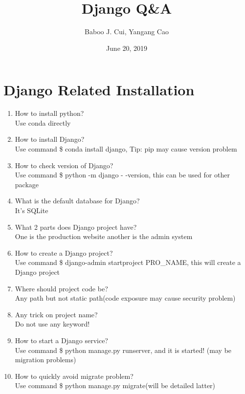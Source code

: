 \documentclass[10pt,a4paper,oneside]{article}
\date{June 20, 2019}
\author{Baboo J. Cui, Yangang Cao}
\title{Django Q\&A}
\begin{document}
\maketitle
\tableofcontents

\newpage

\section{Django Related Installation}
\begin{enumerate}[1.]
\item How to install python?\\
Use conda directly
\item How to install Django?\\
Use command \$ conda install django, Tip: pip may cause version problem
\item How to check version of Django?\\
Use command \$ python -m django - -version, this can be used for other package
\item What is the default database for Django?\\
It’s SQLite
\item What 2 parts does Django project have?\\
One is the production website another is the admin system
\item How to create a Django project?\\
Use command \$ django-admin startproject PRO\_NAME, this will create a Django project
\item Where should project code be?\\
Any path but not static path(code exposure may cause security problem)
\item Any trick on project name?\\
Do not use any keyword!
\item How to start a Django service?\\
Use command \$ python manage.py runserver, and it is started! (may be migration problems)
\item How to quickly avoid migrate problem?\\
Use command \$ python manage.py migrate(will be detailed latter)
\end{enumerate}
\end{document}
